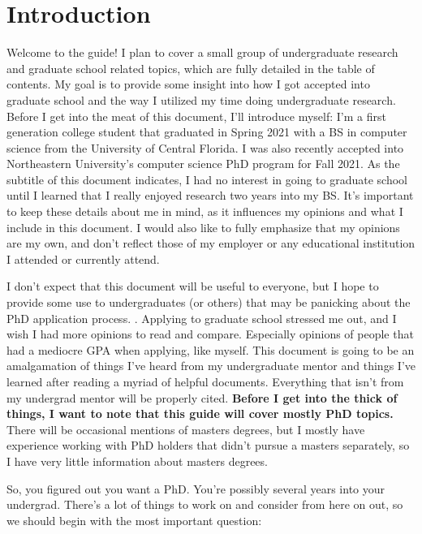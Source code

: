 \documentclass[12pt]{article}
\begin{document}


\begingroup
\hypersetup{linkcolor=black}
\tableofcontents
\pagebreak
\endgroup

\section{Introduction}

Welcome to the guide! I plan to cover a small group of undergraduate research and graduate school related topics, which are fully detailed in the table of contents. My goal is to provide some insight into how I got accepted into graduate school and the way I utilized my time doing undergraduate research. Before I get into the meat of this document, I’ll introduce myself: I’m a first generation college student that graduated in Spring 2021 with a BS in computer science from the University of Central Florida. I was also recently accepted into Northeastern University’s computer science PhD program for Fall 2021. As the subtitle of this document indicates, I had no interest in going to graduate school until I learned that I really enjoyed research two years into my BS. It’s important to keep these details about me in mind, as it influences my opinions and what I include in this document. I would also like to fully emphasize that my opinions are my own, and don’t reflect those of my employer or any educational institution I attended or currently attend. 

I don’t expect that this document will be useful to everyone, but I hope to provide some use to undergraduates (or others) that may be panicking about the PhD application process. . Applying to graduate school stressed me out, and I wish I had more opinions to read and compare. Especially opinions of people that had a mediocre GPA when applying, like myself. This document is going to be an amalgamation of things I’ve heard from my undergraduate mentor and things I’ve learned after reading a myriad of helpful documents. Everything that isn’t from my undergrad mentor will be properly cited. \textbf{Before I get into the thick of things, I want to note that this guide will cover mostly PhD topics.} There will be occasional mentions of masters degrees, but I mostly have experience working with PhD holders that didn’t pursue a masters separately, so I have very little information about masters degrees.


So, you figured out you want a PhD. You’re possibly several years into your undergrad. There’s a lot of things to work on and consider from here on out, so we should begin with the most important question: 
\end{document}
